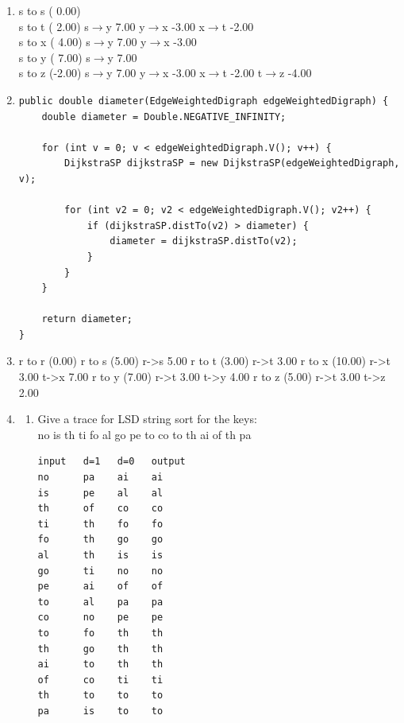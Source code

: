 \documentclass[11pt,fleqn]{article}
\begin{document}
\begin{enumerate}
	\item
s to s ( 0.00)  \\
s to t ( 2.00)  s$\rightarrow$y  7.00   y$\rightarrow$x -3.00   x$\rightarrow$t -2.00   \\
s to x ( 4.00)  s$\rightarrow$y  7.00   y$\rightarrow$x -3.00   \\
s to y ( 7.00)  s$\rightarrow$y  7.00   \\
s to z (-2.00)  s$\rightarrow$y  7.00   y$\rightarrow$x -3.00   x$\rightarrow$t -2.00   t$\rightarrow$z -4.00   \\

	\item 
\begin{Verbatim}
public double diameter(EdgeWeightedDigraph edgeWeightedDigraph) {
	double diameter = Double.NEGATIVE_INFINITY;

	for (int v = 0; v < edgeWeightedDigraph.V(); v++) {
		DijkstraSP dijkstraSP = new DijkstraSP(edgeWeightedDigraph, v);

		for (int v2 = 0; v2 < edgeWeightedDigraph.V(); v2++) {
			if (dijkstraSP.distTo(v2) > diameter) {
				diameter = dijkstraSP.distTo(v2);
			}
		}
	}

	return diameter;
}
\end{Verbatim}

	\item
r to r (0.00)  
r to s (5.00)  r->s  5.00   
r to t (3.00)  r->t  3.00   
r to x (10.00)  r->t  3.00   t->x  7.00   
r to y (7.00)  r->t  3.00   t->y  4.00   
r to z (5.00)  r->t  3.00   t->z  2.00

	\item
	\begin{enumerate}
		\item
Give a trace for LSD string sort for the keys:  \\
no is th ti fo al go pe to co to th ai of th pa 
\begin{Verbatim}
input   d=1   d=0   output 
no      pa    ai    ai
is      pe    al    al
th      of    co    co
ti      th    fo    fo
fo      th    go    go
al      th    is    is
go      ti    no    no
pe      ai    of    of
to      al    pa    pa
co      no    pe    pe
to      fo    th    th
th      go    th    th
ai      to    th    th
of      co    ti    ti
th      to    to    to
pa      is    to    to
\end{Verbatim}


\end{enumerate}
\end{enumerate}
\end{document}
